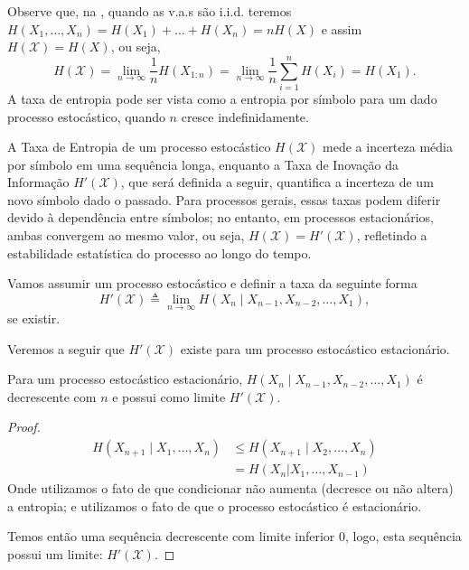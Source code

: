 Observe que, na , quando as v.a.s são i.i.d. teremos $H(X_1, \ldots, X_n) = H(X_1) + \ldots + H(X_n) = n H(X)$ e assim $H(\mathcal{X}) = H(X)$, ou seja,
\begin{equation}
  H(\mathcal{X}) = \lim_{n \rightarrow \infty} \frac{1}{n} H(X_{1:n}) = \lim_{n \rightarrow \infty} \frac{1}{n} \sum_{i=1}^n H(X_i) = H(X_1) .
\end{equation}
A taxa de entropia pode ser vista como a entropia por símbolo para um dado processo estocástico, quando $n$ cresce indefinidamente.



A Taxa de Entropia de um processo estocástico $H(\mathcal{X})$
mede a incerteza média por símbolo em uma sequência longa, 
enquanto a Taxa de Inovação da Informação $H'(\mathcal{X})$,
que será definida a seguir, quantifica a incerteza de um novo símbolo dado o passado. Para
processos gerais, essas taxas podem diferir devido à dependência entre
símbolos; no entanto, em processos estacionários, ambas
convergem ao mesmo valor, ou seja, $H(\mathcal{X}) = H'(\mathcal{X})$,
refletindo a estabilidade estatística do processo ao longo do tempo.

 \begin{definition}
  Vamos assumir um processo estocástico e definir a taxa da seguinte forma
  \begin{equation}
    H'(\mathcal{X}) \triangleq \lim_{n \rightarrow \infty} H(X_n \mid X_{n-1}, X_{n-2}, \ldots , X_1) ,
  \end{equation}
  se existir.
 \end{definition}
 Veremos a seguir que $H'(\mathcal{X})$ existe para um processo estocástico estacionário.

 \begin{theorem}
  Para um processo estocástico estacionário, $H(X_n \mid X_{n-1}, X_{n-2}, \ldots , X_1)$ é decrescente com $n$ e possui como limite $H'(\mathcal{X})$.
\end{theorem}
\begin{proof}
  \begin{subequations}
  \begin{align}
  H(X_{n+1} \mid X_1, \ldots, X_n) &\leq H(X_{n+1} \mid X_2, \ldots, X_n) \\
                &= H(X_n | X_1, \ldots, X_{n-1})
  \end{align}
  \end{subequations}
  Onde utilizamos o fato de que condicionar não aumenta (decresce ou não altera) a entropia;
  e utilizamos o fato de que o processo estocástico é estacionário.

  Temos então uma sequência decrescente com limite inferior $0$, logo, esta sequência possui um limite: $H'(\mathcal{X})$.
\end{proof}

